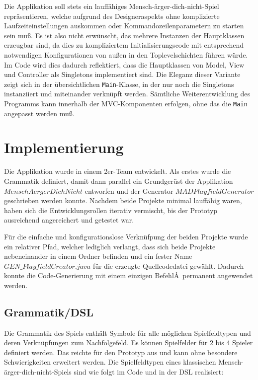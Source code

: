 \documentclass[conference]{IEEEtran}
\begin{document}
Die Applikation soll stets ein lauff\"ahiges Mensch-\"arger-dich-nicht-Spiel repr\"asentieren, welche aufgrund des Designeraspekts ohne komplizierte Laufzeiteinstellungen auskommen oder Kommandozeilenparametern zu starten sein mu\ss. Es ist also nicht erw\"unscht, das mehrere Instanzen der Hauptklassen erzeugbar sind, da dies zu kompliziertem Initialisierungscode mit entsprechend notwendigen Konfigurationen von au\ss en in den Toplevelschichten f\"uhren w\"urde. Im Code wird dies dadurch reflektiert, dass die Hauptklassen von Model, View und Controller als Singletons implementiert sind.
Die Eleganz dieser Variante zeigt sich in der \"ubersichtlichen \texttt{Main}-Klasse, in der nur noch die Singletons instanziiert und miteinander verkn\"upft werden. S\"amtliche Weiterentwicklung des Programms kann innerhalb der MVC-Komponenten erfolgen, ohne das die \texttt{Main} angepasst werden mu\ss .

\section{Implementierung}
Die Applikation wurde in einem 2er-Team entwickelt. Als erstes wurde die Grammatik definiert, damit dann parallel
ein Grundger\"ust der Applikation $MenschAergerDichNicht$ entworfen und der Generator $MADPlayfieldGenerator$ geschrieben werden konnte. Nachdem beide Projekte minimal lauff\"ahig waren, haben sich die Entwicklungsrollen iterativ vermischt, bis der Prototyp ausreichend angereichert und getestet
war.

F\"ur die einfache und konfigurationslose Verkn\"ufpung der beiden Projekte wurde ein relativer Pfad, welcher lediglich verlangt, dass sich beide Projekte nebeneinander in einem Ordner befinden und ein fester Name $GEN\_PlayfieldCreator.java$ f\"ur die erzeugte Quellcodedatei gew\"ahlt. Dadurch konnte die Code-Generierung mit einem einzigen BefehlÂ permanent angewendet werden.

\subsection{Grammatik/DSL}
  Die Grammatik des Spiels enth\"alt Symbole f\"ur alle m\"oglichen Spielfeldtypen und deren Verkn\"upfungen zum Nachfolgefeld.
  Es k\"onnen Spielfelder f\"ur 2 bis 4 Spieler definiert werden. Das reichte f\"ur den Prototyp aus und kann ohne besondere
  Schwierigkeiten erweitert werden.
  Die Spielfeldtypen eines klassischen Mensch-\"arger-dich-nicht-Spiels sind wie folgt im Code und in der DSL realisiert:
\end{document}

